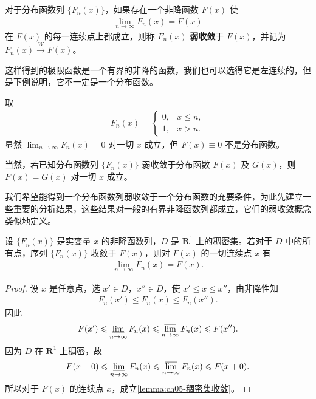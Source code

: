 \documentclass[../../main.tex]{subfiles}
\begin{document}
\begin{definition}[分布函数弱收敛]\label{definition:ch05-分布函数弱收敛}
对于分布函数列 $\{F_n(x)\}$，如果存在一个非降函数 $F(x)$ 使
\begin{align}
\lim_{n\to\infty}F_n(x)=F(x)
\end{align}
在 $F(x)$ 的每一连续点上都成立，则称 $F_n(x)$ \textbf{弱收敛}于 $F(x)$，并记为 $F_n(x)\xrightarrow{W}F(x)$。
\end{definition}

这样得到的极限函数是一个有界的非降的函数，我们也可以选得它是左连续的，但是下例说明，它不一定是一个分布函数。

\begin{example}\label{example:ch05-退化分布逼近2}
取
\begin{align}
F_n(x)=
\begin{cases}
0,&x\leqslant n,\\
1,&x>n.
\end{cases}
\end{align}
显然 $\lim_{n\to\infty}F_n(x)=0$ 对一切 $x$ 成立，但 $F(x)\equiv0$ 不是分布函数。
\end{example}

当然，若已知分布函数列 $\{F_n(x)\}$ 弱收敛于分布函数 $F(x)$ 及 $G(x)$，则 $F(x)=G(x)$ 对一切 $x$ 成立。

我们希望能得到一个分布函数列弱收敛于一个分布函数的充要条件，为此先建立一些重要的分析结果，这些结果对一般的有界非降函数列都成立，它们的弱收敛概念类似地定义。

\begin{lemma}\label{lemma:ch05-稠密集收敛}
设 $\{F_n(x)\}$ 是实变量 $x$ 的非降函数列，$D$ 是 $\mathbf{R}^{1}$ 上的稠密集。若对于 $D$ 中的所有点，序列 $\{F_n(x)\}$ 收敛于 $F(x)$，则对 $F(x)$ 的一切连续点 $x$ 有
\begin{align}
\lim_{n\to\infty}F_n(x)=F(x).
\end{align}
\end{lemma}

\begin{proof}
设 $x$ 是任意点，选 $x'\in D$，$x''\in D$，使 $x'\leqslant x\leqslant x''$，由非降性知
\begin{align*}
F_n(x')\leqslant F_n(x)\leqslant F_n(x'').
\end{align*}
因此
\begin{align*}
F(x')\leqslant\varliminf_{n\to\infty}F_n(x)\leqslant\varlimsup_{n\to\infty}F_n(x)\leqslant F(x'').
\end{align*}
因为 $D$ 在 $\mathbf{R}^{1}$ 上稠密，故
\begin{align*}
F(x-0)\leqslant\varliminf_{n\to\infty}F_n(x)\leqslant\varlimsup_{n\to\infty}F_n(x)\leqslant F(x+0).
\end{align*}
所以对于 $F(x)$ 的连续点 $x$，成立\cref{lemma:ch05-稠密集收敛}。
\end{proof}
\end{document}
